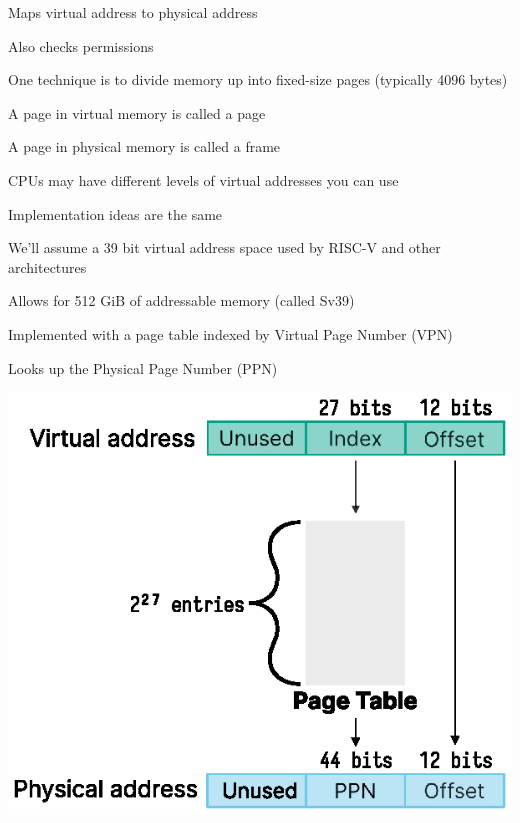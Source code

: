   \begin{slide}


    Maps virtual address to physical address

    \leftspace{}Also checks permissions
    \medskip

    One technique is to divide memory up into fixed-size pages (typically 4096 bytes)

    \leftspace{}A page in virtual memory is called a page

    \leftspace{}A page in physical memory is called a frame

  \end{slide}

  \begin{slide}


    CPUs may have different levels of virtual addresses you can use

    \leftspace{}Implementation ideas are the same
    \medskip

    We'll assume a 39 bit virtual address space used by RISC-V and other
    architectures

    \leftspace{}Allows for 512 GiB of addressable memory (called Sv39)
    \medskip

    Implemented with a page table indexed by Virtual Page Number (VPN)

    \leftspace{}Looks up the Physical Page Number (PPN)

  \end{slide}

  \begin{slide}


    \begin{center}
      \includegraphics{single-level-page-table.eps}
    \end{center}

  \end{slide}

